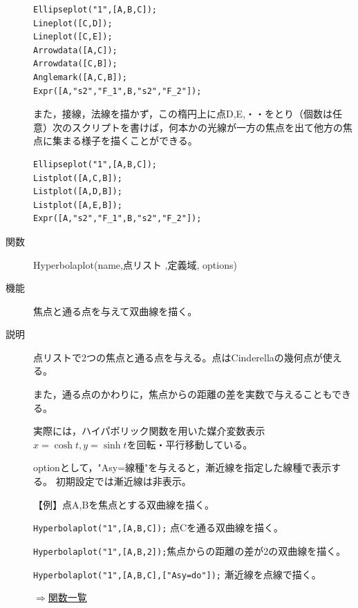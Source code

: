 \documentclass[papersize,a4paper,12pt,uplatex]{jsarticle}
\begin{document}
\begin{description}
\begin{verbatim}
Ellipseplot("1",[A,B,C]);
Lineplot([C,D]);
Lineplot([C,E]);
Arrowdata([A,C]);
Arrowdata([C,B]);
Anglemark([A,C,B]);
Expr([A,"s2","F_1",B,"s2","F_2"]);
\end{verbatim}
\vspace{\baselineskip}
\begin{center} \scalebox{0.9}{}\end{center}

また，接線，法線を描かず，この楕円上に点D,E,・・をとり（個数は任意）次のスクリプトを書けば，何本かの光線が一方の焦点を出て他方の焦点に集まる様子を描くことができる。

\begin{verbatim}
Ellipseplot("1",[A,B,C]);
Listplot([A,C,B]);
Listplot([A,D,B]);
Listplot([A,E,B]);
Expr([A,"s2","F_1",B,"s2","F_2"]);
\end{verbatim}

\begin{center} \scalebox{0.9}{} \end{center}


\hypertarget{hyperbolaplot}{}
\item[関数]Hyperbolaplot(name,点リスト ,定義域, options)
\item[機能]焦点と通る点を与えて双曲線を描く。
\item[説明]点リストで2つの焦点と通る点を与える。点はCinderellaの幾何点が使える。

また，通る点のかわりに，焦点からの距離の差を実数で与えることもできる。

実際には，ハイパボリック関数を用いた媒介変数表示 $x=\cosh t,y=\sinh t$を回転・平行移動している。

optionとして，"Asy=線種"を与えると，漸近線を指定した線種で表示する。 初期設定では漸近線は非表示。

\vspace{\baselineskip}
【例】点A,Bを焦点とする双曲線を描く。

\verb|Hyperbolaplot("1",[A,B,C]);| 点Cを通る双曲線を描く。

\verb|Hyperbolaplot("1",[A,B,2]);|焦点からの距離の差が2の双曲線を描く。

\verb|Hyperbolaplot("1",[A,B,C],["Asy=do"]);| 漸近線を点線で描く。

\vspace{\baselineskip}
\hspace{20mm} \scalebox{0.9}{}
\begin{flushright}\hyperlink{functionlist}{$\Rightarrow$関数一覧}\end{flushright}


\end{description}
\end{document}
